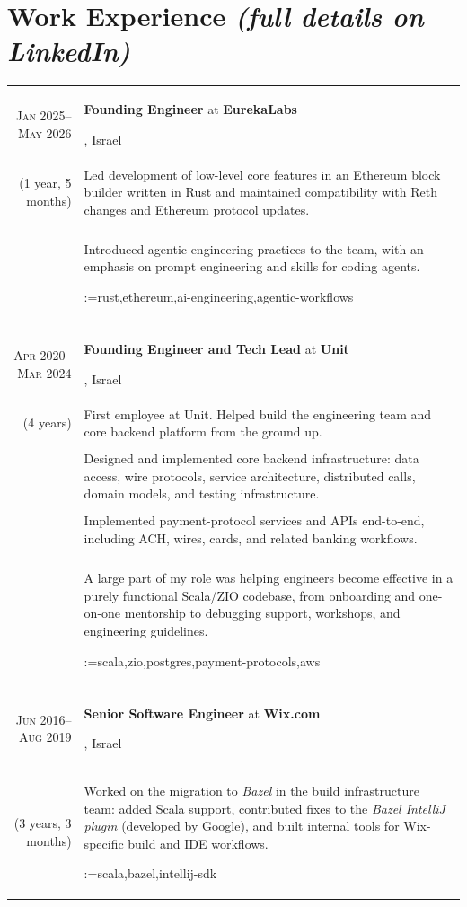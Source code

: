 \documentclass[a4paper,11pt]{article}
\makeatletter
\newcommand{\sotag}[1]{\tikz[baseline]{\node[anchor=base, rounded corners=0.5ex, text height=1.5ex, text depth=.25ex, fill=tagbg, draw=tagbg, text=tagtxt] {#1};}}
\newcommand{\sotagrow}[1]{\par\vspace{4pt}\noindent\@for\sotagitem:=#1\do{\sotag{\sotagitem} }\\}
\newcommand{\job}[2]{\large\sffamily \textbf{#1} at \textbf{#2}\rule[-0.45em]{0pt}{1.45em}}
\newcommand{\sep}{\multicolumn{2}{c}{}\\}
\makeatother
\begin{document}
\section{Work Experience \hfill{\normalfont\footnotesize\itshape (full details on LinkedIn)}}
\begin{longtable}{r|p{}}

  \textsc{Jan 2025--May 2026} & \job{Founding Engineer}{EurekaLabs}, Israel \\(1 year, 5 months)
    &Led development of low-level core features in an Ethereum block builder written in Rust and maintained compatibility with Reth changes and Ethereum protocol updates.\\&\\
    &Introduced agentic engineering practices to the team, with an emphasis on prompt engineering and skills for coding agents.
    \sotagrow{rust,ethereum,ai-engineering,agentic-workflows}\sep

  \textsc{Apr 2020--Mar 2024} & \job{Founding Engineer and Tech Lead}{Unit}, Israel \\(4 years)
    &First employee at Unit. Helped build the engineering team and core backend platform from the ground up.\\&\\
    &Designed and implemented core backend infrastructure: data access, wire protocols, service architecture, distributed calls, domain models, and testing infrastructure.\\&\\
    &Implemented payment-protocol services and APIs end-to-end, including ACH, wires, cards, and related banking workflows.\\&\\
    &A large part of my role was helping engineers become effective in a purely functional Scala/ZIO codebase, from onboarding and one-on-one mentorship to debugging support, workshops, and engineering guidelines.
    \sotagrow{scala,zio,postgres,payment-protocols,aws}\sep

  \textsc{Jun 2016--Aug 2019} & \job{Senior Software Engineer}{Wix.com}, Israel \\(3 years, 3 months)
    &Worked on the migration to \textit{Bazel} in the build infrastructure team: added Scala support, contributed fixes to the \textit{Bazel IntelliJ plugin} (developed by Google), and built internal tools for Wix-specific build and IDE workflows.\sotagrow{scala,bazel,intellij-sdk}
\end{longtable}
\end{document}
